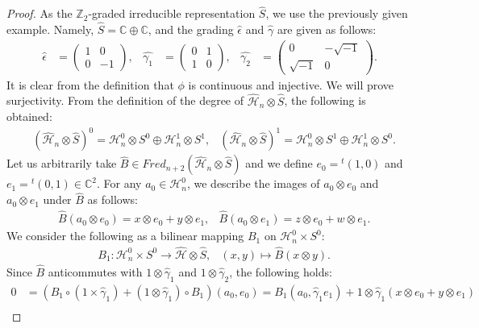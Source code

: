 \documentclass{amsart}
\theoremstyle{definition}
\theoremstyle{remark}
\begin{document}
\begin{proof}
As the $\mathbb{Z}_2$-graded irreducible representation $\hat{S}$, we use the previously given example. Namely, $\hat{S} = \mathbb{C}\oplus \mathbb{C}$, and the grading $\hat{\epsilon}$ and $\hat{\gamma}$ are given as follows:
\begin{align*}
\hat{\epsilon}&=\begin{pmatrix} 
1 & 0 \\
0& -1
\end{pmatrix},&
\hat{\gamma_{1}}&=\begin{pmatrix}
0 & 1 \\
1 & 0
\end{pmatrix},&
\hat{\gamma_{2}}&=
\begin{pmatrix} 
  0 & -\sqrt{-1} \\
  \sqrt{-1} & 0
\end{pmatrix}.
\end{align*}
It is clear from the definition that $\phi$ is continuous and injective. We will prove surjectivity. From the definition of the degree of \(\hat{\mathcal{H}}_n \otimes \hat{S}\), the following is obtained:
\begin{align*}
&(\hat{\mathcal{H}}_n\otimes \hat{S})^0=\mathcal{H}_n^0 \otimes S^0 \oplus \mathcal{H}_n^1 \otimes S^1, 
&(\hat{\mathcal{H}}_n\otimes \hat{S})^1=\mathcal{H}_n^0 \otimes S^1 \oplus \mathcal{H}_n^1 \otimes S^0.
\end{align*}
Let us arbitrarily take \(\hat{B} \in Fred_{n+2}(\hat{\mathcal{H}}_n \otimes \hat{S})\) and we define \(e_0 = {}^t\!(1,0)\) and \(e_1 = {}^t\!(0,1) \in \mathbb{C}^2\). 
For any \(a_0 \in \mathcal{H}_n^0\), we describe the images of \(a_0 \otimes e_0\) and \(a_0 \otimes e_1\) under \(\hat{B}\) as follows:
\begin{align*}
&\hat{B}(a_0 \otimes e_0)=x \otimes e_0+y \otimes e_1, &\hat{B}(a_0 \otimes e_1)=z\otimes e_0+w\otimes e_1.
\end{align*}
We consider the following as a bilinear mapping \(B_1\) on \(\mathcal{H}_n^0 \times S^0\):
\begin{align*}
&B_1\colon \mathcal{H}_n^0 \times S^0 \to \hat{\mathcal{H}}\otimes \hat{S}, &(x,y)\mapsto \hat{B}(x\otimes y).
\end{align*}
Since $\hat{B}$ anticommutes with $1 \otimes \hat{\gamma}_1$ and $1\otimes \hat{\gamma}_2$, the following holds:
\begin{align*}
0&=(B_1 \circ (1\times \hat{\gamma}_1)+(1\otimes \hat{\gamma}_1) \circ B_1)(a_0, e_0)
=B_1(a_0, \hat{\gamma}_1 e_1)+1 \otimes \hat{\gamma}_1(x \otimes e_0+y \otimes e_1)\\

\end{align*}
\end{proof}
\end{document}
